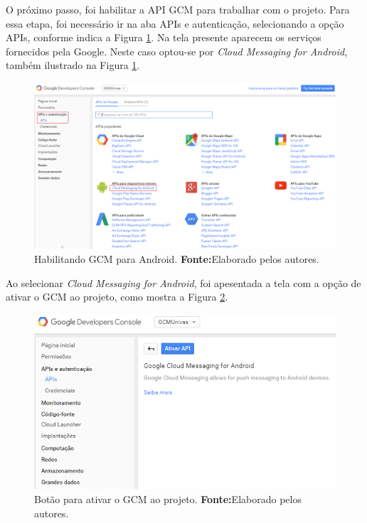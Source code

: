 	\par O próximo passo, foi habilitar a API GCM para trabalhar com o projeto.
Para essa etapa, foi necessário ir na aba APIs e autenticação, selecionando a
opção APIs, conforme indica a Figura \ref{fig:gcm4}. Na tela presente aparecem
os serviços fornecidos pela Google. Neste caso optou-se por \textit{Cloud
Messaging for Android}, também ilustrado na Figura \ref{fig:gcm4}.

	\begin{figure}[h!] 
		\centerline{\includegraphics[scale=0.4]{./imagens/2_q_metodologico/4_procedimentos_resultados/41_gcm/gcm4.png}}
		\caption[Habilitando GCM para Android]{Habilitando GCM para Android.
		\textbf{Fonte:}Elaborado pelos autores.}
		\label{fig:gcm4}
	\end{figure}
	
	\par Ao selecionar \textit{Cloud Messaging for Android}, foi apesentada a
tela com a opção de ativar o GCM ao projeto, como mostra a Figura \ref{fig:gcm5}.

	\begin{figure}[h!] 
		\centerline{\includegraphics[scale=0.66]{./imagens/2_q_metodologico/4_procedimentos_resultados/41_gcm/gcm5.png}}
		\caption[Botão para ativar o GCM ao projeto]{Botão para ativar o GCM ao projeto.
		\textbf{Fonte:}Elaborado pelos autores.}
		\label{fig:gcm5}
	\end{figure}
	
